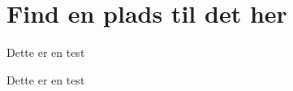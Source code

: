\chapter{Find en plads til det her}

Dette er en test \cite{aau:formalia}

Dette er en test \citep{aau:formalia}